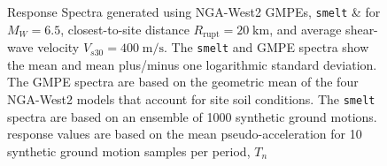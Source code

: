 \begin{figure}[!htbp]
  \caption[Response Spectra generated using NGA-West2
    GMPEs, \texttt{smelt} \& \texttt{\getsoftwarename{}} for $M_W = 6.5$, $R_{\textrm{rupt}}
    = 20\;\textrm{km}$, and $V_{s30} = 400\;\textrm{m/s}$]
    {Response Spectra generated using NGA-West2
    GMPEs, \texttt{smelt} \& \texttt{\getsoftwarename{}} for $M_W = 6.5$,
    closest-to-site distance $R_{\textrm{rupt}} = 20\;\textrm{km}$, and average shear-wave
    velocity $V_{s30} = 400\;\textrm{m/s}$. The \texttt{smelt} and GMPE
    spectra show the mean and mean plus/minus one logarithmic standard
    deviation. The GMPE spectra are based on the geometric mean of the
    four NGA-West2 models that account for site soil
    conditions. The \texttt{smelt} spectra are based on an ensemble of
    1000 synthetic ground motions. \texttt{\getsoftwarename{}} response values are
    based on the mean pseudo-acceleration for 10 synthetic ground
    motion samples per period, $T_n$}
  \label{fig:stochastic_validation}
\end{figure}
